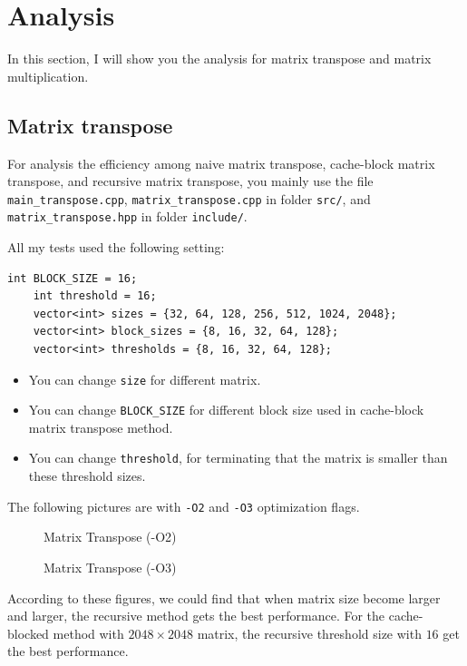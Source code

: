 \documentclass[11pt]{article}
\begin{document}
\newpage

\section{Analysis}
In this section, I will show you the analysis for matrix transpose and matrix multiplication.

\subsection{Matrix transpose}
For analysis the efficiency among naive matrix transpose, cache-block matrix transpose, and recursive matrix transpose, you mainly use the file \verb|main_transpose.cpp|, \verb|matrix_transpose.cpp| in folder \texttt{src/}, and \verb|matrix_transpose.hpp| in folder \texttt{include/}.

All my tests used the following setting:

\begin{lstlisting}[style=C++Style]
    int BLOCK_SIZE = 16;  
    int threshold = 16; 
    vector<int> sizes = {32, 64, 128, 256, 512, 1024, 2048};
    vector<int> block_sizes = {8, 16, 32, 64, 128};
    vector<int> thresholds = {8, 16, 32, 64, 128};
\end{lstlisting}
\begin{itemize}
    \item You can change \verb|size| for different matrix.
    \item You can change \verb|BLOCK_SIZE| for different block size used in cache-block matrix transpose method.
    \item You can change \verb|threshold|, for terminating that the matrix is smaller than these threshold sizes. 
\end{itemize}

The following pictures are with \verb|-O2| and \verb|-O3| optimization flags.
\begin{figure}[H]
    \centering
    
    \caption{Matrix Transpose (-O2)}
    \label{fig2:Matrix Transpose (-O2)}
\end{figure}

\begin{figure}[H]
    \centering
    
    \caption{Matrix Transpose (-O3)}
    \label{fig3:Matrix Transpose (-O3)}
\end{figure}

According to these figures, we could find that when matrix size become larger and larger, the recursive method gets the best performance. For the cache-blocked method with $2048 \times 2048$ matrix, the recursive threshold size with $16$ get the best performance. 
\end{document}
